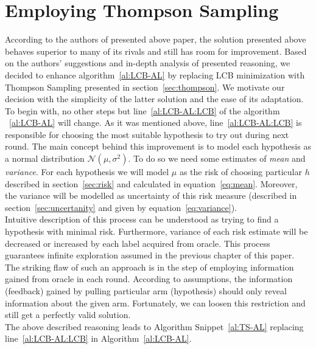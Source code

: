 \documentclass[12pt, a4paper, pdflatex, leqno, twoside]{report}
\begin{document}
\section{Employing Thompson Sampling\label{sec:thompsonimprovement}}
According to the authors of presented above paper, the solution presented above behaves superior to many of its 
rivals and still has room for improvement. Based on the authors' suggestions and 
in-depth analysis of presented reasoning, we decided to enhance 
algorithm~\ref{al:LCB-AL} by replacing LCB minimization with Thompson Sampling presented in section~\ref{sec:thompson}. 
We motivate our decision with the simplicity of the latter solution and the ease of its adaptation.\\

To begin with, no other steps  but line~\ref{al:LCB-AL:LCB} of the algorithm  ~\ref{al:LCB-AL} will change. As it was mentioned above, line~\ref{al:LCB-AL:LCB} is 
responsible for choosing the most suitable hypothesis to try out during next 
round. The main concept behind this improvement is to model each hypothesis as a 
normal distribution $\mathcal{N}\left( \mu, \sigma^2 \right)$. To do so we need 
some estimates of \emph{mean} and \emph{variance}. For each hypothesis we will 
model $\mu$ as the risk of choosing particular $h$ described in 
section~\ref{sec:risk} and calculated in equation~\ref{eq:mean}. Moreover, the 
variance will be modelled as uncertainty of this risk measure (described in 
section~\ref{sec:uncertanity} and given by equation~\ref{eq:variance}).\\

Intuitive description of this process can be understood as trying to find a 
hypothesis with minimal risk. Furthermore, variance of each risk estimate will 
be decreased or increased by each label acquired from oracle. This process 
guarantees infinite exploration assumed in the previous chapter of this paper.\\
The striking flaw of such an approach is in the step of employing information 
gained from oracle in each round. According to assumptions, the information 
(feedback) gained by pulling particular arm (hypothesis) should only reveal 
information about the given arm. Fortunately, we can loosen this restriction and 
still get a perfectly valid solution.\\

The above described reasoning leads to Algorithm Snippet~\ref{al:TS-AL} replacing 
line~\ref{al:LCB-AL:LCB} in Algorithm~\ref{al:LCB-AL}.
\end{document}
